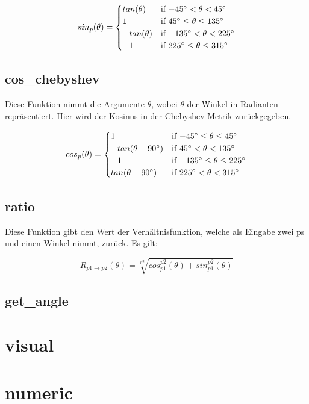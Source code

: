 \documentclass{article}
\begin{document}
\[   
sin_p(\theta) = 
     \begin{cases}
       tan(\theta) & $if $ -45 \degree < \theta < 45 \degree \\
       1 &  $if $ 45 \degree \leq \theta \leq 135 \degree \\
       -tan(\theta) & $if $ -135 \degree < \theta < 225 \degree \\ 
       -1 & $if $ 225 \degree \leq \theta \leq 315 \degree \\
     \end{cases}
\]

\subsection{cos\_chebyshev}

Diese Funktion nimmt die Argumente $\theta$, wobei $\theta$ der Winkel in Radianten repräsentiert. Hier wird der Kosinus in der Chebyshev-Metrik zurückgegeben.

\[   
cos_p(\theta) = 
     \begin{cases}
       1 & $if $ -45 \degree \leq \theta \leq 45 \degree \\
       -tan(\theta - 90 \degree) &  $if $ 45 \degree < \theta < 135 \degree \\
       -1 & $if $ -135 \degree \leq \theta \leq 225 \degree \\ 
       tan(\theta - 90 \degree) & $if $ 225 \degree < \theta < 315 \degree \\
     \end{cases}
\]

\subsection{ratio}

Diese Funktion gibt den Wert der  Verhältnisfunktion, welche als Eingabe zwei ps und einen Winkel nimmt, zurück. Es gilt:

\begin{equation}
R_{p1 \rightarrow p2}(\theta) = \sqrt[p2]{cos_{p1}^{p2}(\theta) + sin_{p1}^{p2}(\theta)}
\end{equation}

\subsection{get\_angle}

\section{visual}

\section{numeric}
\end{document}
